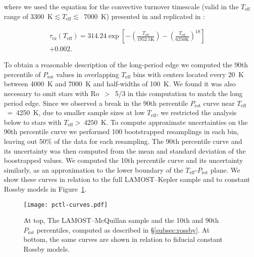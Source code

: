 \documentclass[linenumbers,tighten,trackchanges,twocolumn]{aastex631}
\newcommand{\teff}{\ensuremath{T_{\mathrm{eff}}}\xspace}
\newcommand{\prot}{\ensuremath{P_\mathrm{rot}}\xspace}
\begin{document}
where we used the equation for the convective turnover timescale (valid in the \teff range of 3300~K$\lesssim \teff \lesssim$~7000~K) presented in \citet{Gunn1998} and replicated in \citet{CranmerSaar2011}:

\begin{multline}
\tau_\mathrm{cz}(\teff) = 314.24\exp \left [ -\left (\frac{T_\mathrm{eff}}{1952.5 \mathrm{K}}  \right ) - \left (\frac{T_\mathrm{eff}}{6250 \mathrm{K}}  \right )^{18} \right ] \\+ 0.002.
\end{multline}

To obtain a reasonable description of the long-period edge we computed the 90th percentile of \prot values in overlapping \teff bins with centers located every 20~K between 4000~K and 7000~K and half-widths of 100~K. We found it was also necessary to omit stars with Ro~$>$~5/3 in this computation to match the long period edge. Since we observed a break in the 90th percentile \prot curve near \teff~=~4250~K, due to smaller sample sizes at low \teff, we restricted the analysis below to stars with \teff$>~4250$~K. To compute approximate uncertainties on the 90th percentile curve we performed 100 bootstrapped resamplings in each bin, leaving out 50\% of the data for each resampling. The 90th percentile curve and its uncertainty was then computed from the mean and standard deviation of the boostrapped values. We computed the 10th percentile curve and its uncertainty similarly, as an approximation to the lower boundary of the \teff-\prot plane. We show these curves in relation to the full LAMOST--Kepler sample and to constant Rossby models in Figure~\ref{fig:pctl}.

\begin{figure}
    \centering
    \texttt{[image: pctl-curves.pdf]}
    \caption{At top, The LAMOST--McQuillan sample and the 10th and 90th \prot percentiles, computed as described in \S\ref{subsec:rossby}. At bottom, the same curves are shown in relation to fiducial constant Rossby models.}
    \label{fig:pctl}
\end{figure}


\end{document}
